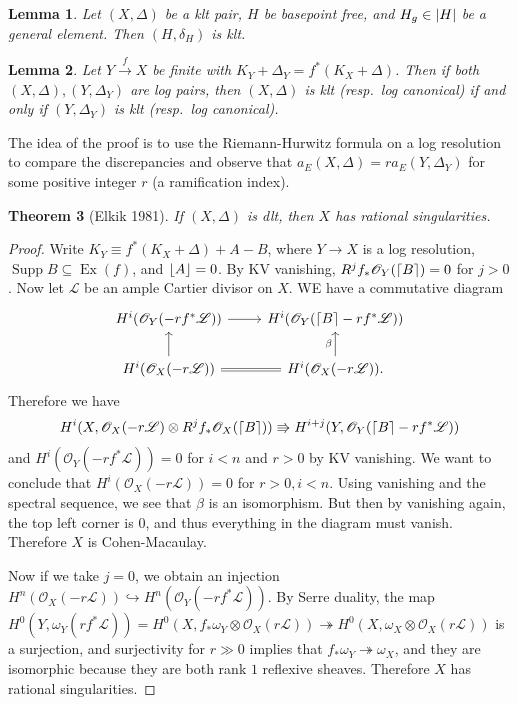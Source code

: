 \documentclass[leqno, openany]{memoir}
\DeclarePairedDelimiter{\floor}{\lfloor}{\rfloor}
\DeclarePairedDelimiter{\ceil}{\lceil}{\rceil}
\newtheorem{thm}{Theorem}[section]
\newtheorem{lem}[thm]{Lemma}
\theoremstyle{definition}
\theoremstyle{remark}
\theoremstyle{plain}
\theoremstyle{definition}
\theoremstyle{remark}
\newcommand{\msc}[1]{\mathscr{#1}}
\DeclareMathOperator{\Supp}{Supp}
\begin{document}
\begin{lem}
    Let $(X, \Delta)$ be a klt pair, $H$ be basepoint free, and $H_g \in \abs{H}$ be a general element. Then $(H, \delta_H)$ is klt.
\end{lem}

\begin{lem}
    Let $Y \xrightarrow{f} X$ be finite with $K_Y + \Delta_Y = f^*(K_X + \Delta)$. Then if both $(X, \Delta), (Y, \Delta_Y)$ are log pairs, then $(X, \Delta)$ is klt (resp.~log canonical) if and only if $(Y, \Delta_Y)$ is klt (resp.~log canonical).
\end{lem}

The idea of the proof is to use the Riemann-Hurwitz formula on a log resolution to compare the discrepancies and observe that $a_E(X, \Delta) = ra_E(Y, \Delta_Y)$ for some positive integer $r$ (a ramification index).

\begin{thm}[Elkik 1981]
    If $(X, \Delta)$ is dlt, then $X$ has rational singularities.
\end{thm}

\begin{proof}
    Write $K_Y \equiv f^*(K_X + \Delta) + A - B$, where $Y \to X$ is a log resolution, $\Supp B \subseteq \operatorname{Ex}(f)$, and $\floor{A} = 0$. By KV vanishing, $R^j f_* \msc{O}_Y(\ceil{B}) = 0$ for $j > 0$. Now let $\msc{L}$ be an ample Cartier divisor on $X$. WE have a commutative diagram
    \begin{equation*}
    \begin{tikzcd}
        H^i(\msc{O}_Y(-rf^* \msc{L})) \ar{r} & H^i(\msc{O}_Y(\ceil{B} - rf^* \msc{L})) \\
        H^i(\msc{O}_X(-r\msc{L})) \ar{u} \ar[equal]{r} & H^i(\msc{O}_X(-r\msc{L})). \ar{u}{\beta}
    \end{tikzcd}
    \end{equation*}
    Therefore we have
    \[ H^i(X, \msc{O}_X(-r\msc{L}) \otimes R^j f_* \msc{O}_X(\ceil{B})) \Rrightarrow H^{i+j}(Y, \msc{O}_Y(\ceil{B} - rf^*\msc{L})) \]
    and $H^i(\msc{O}_Y(-rf^* \msc{L})) = 0$ for $i < n$ and $r > 0$ by KV vanishing. We want to conclude that $H^i(\msc{O}_X(-r\msc{L})) = 0$ for $r > 0, i < n$. Using vanishing and the spectral sequence, we see that $\beta$ is an isomorphism. But then by vanishing again, the top left corner is $0$, and thus everything in the diagram must vanish. Therefore $X$ is Cohen-Macaulay.

    Now if we take $j = 0$, we obtain an injection $H^n(\msc{O}_X(-r\msc{L})) \hookrightarrow H^n(\msc{O}_Y(-rf^*\msc{L}))$. By Serre duality, the map $H^0(Y, \omega_Y(rf^*\msc{L})) = H^0(X, f_*\omega_Y \otimes \msc{O}_X(r\msc{L})) \twoheadrightarrow H^0(X, \omega_X \otimes \msc{O}_X(r\msc{L}))$ is a surjection, and surjectivity for $r \gg 0$ implies that $f_* \omega_Y \twoheadrightarrow \omega_X$, and they are isomorphic because they are both rank $1$ reflexive sheaves. Therefore $X$ has rational singularities.
\end{proof}
\end{document}
